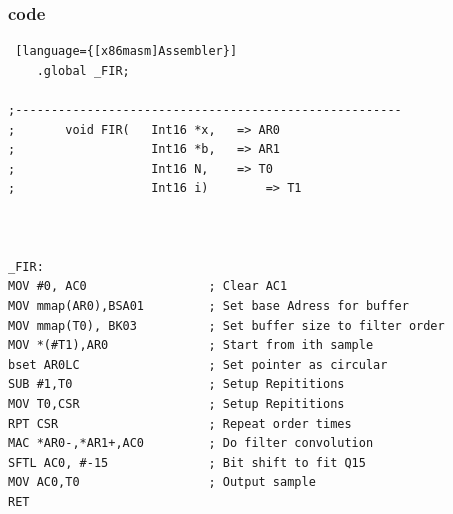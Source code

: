 \subsubsection{code}
\begin{lstlisting} [language={[x86masm]Assembler}]
	.global _FIR;

;------------------------------------------------------
;		void FIR(  	Int16 *x,	=> AR0
;			  		Int16 *b, 	=> AR1
;			   		Int16 N, 	=> T0
;			   		Int16 i)		=> T1



_FIR:	
MOV #0, AC0					; Clear AC1
MOV mmap(AR0),BSA01			; Set base Adress for buffer
MOV mmap(T0), BK03			; Set buffer size to filter order
MOV *(#T1),AR0				; Start from ith sample
bset AR0LC					; Set pointer as circular
SUB #1,T0					; Setup Repititions
MOV T0,CSR					; Setup Repititions
RPT CSR						; Repeat order times
MAC *AR0-,*AR1+,AC0 		; Do filter convolution
SFTL AC0, #-15				; Bit shift to fit Q15
MOV AC0,T0					; Output sample
RET
\end{lstlisting}
